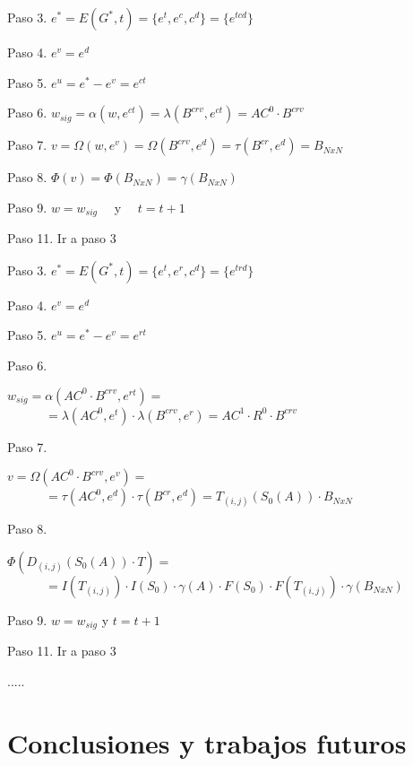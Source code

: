 \documentclass{egpubl}
\begin{document}
\begin{itshape}
	Paso 3. $e^{*} = E(G^{*}, t) = \{ e^{t}, e^{c}, c^{d}\} = \{ e^{tcd}\}$
	
	Paso 4. $e^{v} = e^{d}$
	
	Paso 5. $e^{u} = e^{*} - e^{v} = e^{ct}$
	
	Paso 6. $w_{sig} = \alpha(w, e^{ct}) = \lambda(B^{crv}, e^{ct}) = AC^{0} \cdotp B^{crv}$
	
	Paso 7. $v = \Omega(w, e^{v}) = \Omega(B^{crv}, e^{d}) = \tau(B^{cr}, e^{d}) = B_{NxN}$
	
	Paso 8. $\Phi(v) = \Phi(B_{NxN}) = \gamma(B_{NxN})$
	
	Paso 9. $w = w_{sig}$ \ \ y \ \ $t = t + 1$
	
	Paso 11. Ir a paso 3
	
	Paso 3. $e^{*} = E(G^{*}, t) = \{ e^{t}, e^{r}, c^{d}\} = \{e^{trd}\}$
	
	Paso 4. $e^{v} = e^{d}$
	
	Paso 5. $e^{u} = e^{*} - e^{v} = e^{rt}$
	
	{Paso 6. \raggedright $w_{sig} = \alpha(AC^{0} \cdotp B^{crv}, e^{rt}) =$ \\
	\ \ \ \ \ \ $= \lambda(AC^{0}, e^{t}) \cdotp \lambda(B^{crv}, e^{r}) = AC^{1} \cdotp R^{0} \cdotp B^{crv}$}
	
	{Paso 7. \raggedright  $v = \Omega(AC^{0} \cdotp B^{crv}, e^{v}) =$ \\ 
	\ \ \ \ \ \ $= \tau(AC^{0}, e^{d}) \cdotp \tau(B^{cr}, e^{d}) = T_{(i,j)}(S_{0}(A)) \cdotp B_{NxN}$}
	
	
	{Paso 8. \raggedright $\Phi(D_{(i,j)}(S_{0}(A)) \cdotp T) = $\\
	\ \ \ \ \ \ $= I(T_{(i,j)}) \cdotp I( S_{0} ) \cdotp \gamma(A) \cdotp F(S_{0}) \cdotp F(T_{(i,j)}) \cdotp \gamma(B_{NxN})$}
	
	
	Paso 9. $w = w_{sig}$ y $t = t + 1$


   	Paso 11. Ir a paso 3


   	.....
\end{itshape}




\section{Conclusiones y trabajos futuros
\label{sec:conclusiones}}
\end{document}
